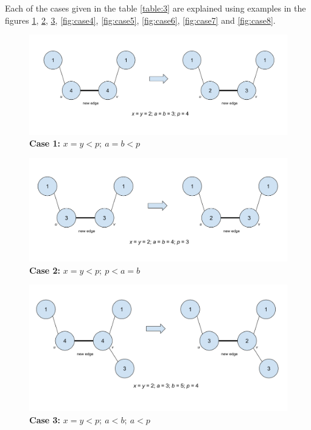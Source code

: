 \documentclass[MTech]{iitmdiss}
\begin{document}
Each of the cases given in the table \ref{table:3} are explained using examples in the figures \ref{fig:case1}, \ref{fig:case2}, \ref{fig:case3}, \ref{fig:case4}, \ref{fig:case5}, \ref{fig:case6}, \ref{fig:case7} and \ref{fig:case8}.

\begin{figure}[h]
    \centering
    \includegraphics[width=\textwidth,keepaspectratio=true]{case1.jpg}
    \caption{
        \textbf{Case 1:} $x=y < p; \: a=b<p$
    }
    \label{fig:case1}
\end{figure}

\begin{figure}[h]
    \centering
    \includegraphics[width=\textwidth,keepaspectratio=true]{case2.jpg}
    \caption{
        \textbf{Case 2:} $x=y < p; \: p<a=b$
    }
    \label{fig:case2}
\end{figure}

\begin{figure}[h]
    \centering
    \includegraphics[width=\textwidth,keepaspectratio=true]{case3.jpg}
    \caption{
        \textbf{Case 3:} $x=y < p; \: a<b; \: a<p$
    }
    \label{fig:case3}
\end{figure}
\end{document}
